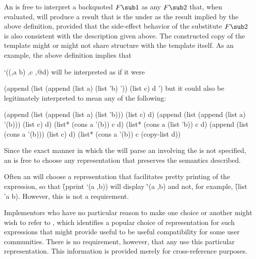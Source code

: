 An  is free to interpret a backquoted  $F\sub 1$
as any  $F\sub 2$ that, when evaluated, will produce a result that is
the  under  as the result implied by the above definition, 
provided that the side-effect behavior of the substitute  $F\sub 2$ 
is also consistent with the description given above.
The constructed
copy of the template might or might not share  structure with the
template itself.  As an example, the above definition implies that

\code
 `((,a b) ,c ,@d)
\endcode
will be interpreted as if it were

\code
 (append (list (append (list a) (list 'b) '\nil)) (list c) d '\nil)
\endcode
but it could also be legitimately interpreted to mean any of the following:

\code
 (append (list (append (list a) (list 'b))) (list c) d)
 (append (list (append (list a) '(b))) (list c) d)
 (list* (cons a '(b)) c d)
 (list* (cons a (list 'b)) c d)
 (append (list (cons a '(b))) (list c) d)
 (list* (cons a '(b)) c (copy-list d))
\endcode
               

Since the exact manner in which the  will parse
an  involving the   
is not specified, an  is free to choose any
representation that preserves the semantics described.

Often an  will choose a representation that facilitates
pretty printing of the expression, so that \f{(pprint `(a ,b))} will display
\f{`(a ,b)} and not, for example, \f{(list 'a b)}.  However, this is not a
requirement.

Implementors who have no particular reason to make one choice or another
might wish to refer to {\IEEEScheme}, which identifies a popular choice of
representation for such expressions that might provide useful to be useful
compatibility for some user communities.  There is no requirement, however,
that any  use this particular representation.
This information is provided merely for cross-reference purposes.

